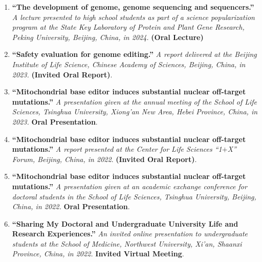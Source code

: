 \begin{enumerate}
    \item \textbf{``The development of genome, genome sequencing and sequencers.''}
    \textit{A lecture presented to high school students as part of a science popularization program at the State Key Laboratory of Protein and Plant Gene Research, Peking University, Beijing, China, in 2024.}
    \textbf{(Oral Lecture)}
    \item \textbf{``Safety evaluation for genome editing.''}
    \textit{A report delivered at the Beijing Institute of Life Science, Chinese Academy of Sciences, Beijing, China, in 2023.} 
    \textbf{(Invited Oral Report)}.
    \item \textbf{``Mitochondrial base editor induces substantial nuclear off-target mutations.''}
    \textit{A presentation given at the annual meeting of the School of Life Sciences, Tsinghua University, Xiong'an New Area, Hebei Province, China, in 2023.} 
    \textbf{Oral Presentation}.
    \item \textbf{``Mitochondrial base editor induces substantial nuclear off-target mutations.''}
    \textit{A report presented at the Center for Life Sciences ``1$+$X'' Forum, Beijing, China, in 2022}. 
    \textbf{(Invited Oral Report)}.
    \item \textbf{``Mitochondrial base editor induces substantial nuclear off-target mutations.''}
    \textit{A presentation given at an academic exchange conference for doctoral students in the School of Life Sciences, Tsinghua University, Beijing, China, in 2022.} 
    \textbf{Oral Presentation}.
    \item \textbf{``Sharing My Doctoral and Undergraduate University Life and Research Experiences.''}
    \textit{An invited online presentation to undergraduate students at the School of Medicine, Northwest University, Xi’an, Shaanxi Province, China, in 2022.} 
    \textbf{Invited Virtual Meeting}.
\end{enumerate}
